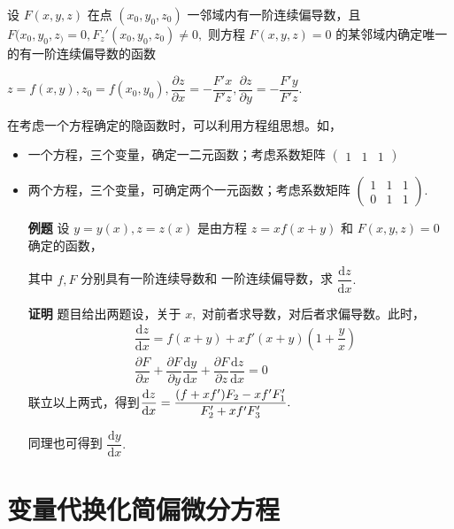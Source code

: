 
设 $ F(x,y,z) $ 在点 $ (x_0,y_0,z_0) $ 一邻域内有一阶连续偏导数，且 $ F(x_0,y_0,z_) = 0, F_z'(x_0,y_0,z_0) \neq 0, $ 
则方程 $ F(x,y,z) = 0 $ 的某邻域内确定唯一的有一阶连续偏导数的函数 

$ z = f(x,y), z_0 = f(x_0,y_0),
\dfrac{\partial z}{\partial x} = - \dfrac{F'x}{F'z},\dfrac{\partial z}{\partial y} = - \dfrac{F'y}{F'z}.  $ 

在考虑一个方程确定的隐函数时，可以利用方程组思想。如，
\begin{itemize}
    \item 一个方程，三个变量，确定一二元函数；考虑系数矩阵 $ \begin{pmatrix}
        1&1&1
    \end{pmatrix} $ 
    \item 两个方程，三个变量，可确定两个一元函数；考虑系数矩阵 $ \begin{pmatrix}
        1&1&1\\0&1&1
    \end{pmatrix}. $ 
\end{itemize}

\begin{itemize}
    \item[\textbf{例题}] 设 $ y = y(x),z = z(x) $ 是由方程 $ z = xf(x + y) $ 和 
    $ F(x,y,z) = 0 $ 确定的函数，
    
    其中 $ f,F $ 分别具有一阶连续导数和
    一阶连续偏导数，求 $ \dfrac{\mathrm{d}z}{\mathrm{d}x}. $ 
    \item[\textbf{证明}]
    题目给出两题设，关于 $ x, $ 对前者求导数，对后者求偏导数。此时，
    \begin{equation*}
        \begin{aligned}
            &\dfrac{\mathrm{d}z}{\mathrm{d}x} = f(x+y)+xf'(x+y)(1+\dfrac{y}{x}) \\ 
            &\dfrac{\partial F}{\partial x}+\dfrac{\partial F}{\partial y}\dfrac{\mathrm{d}y}{\mathrm{d}x}
            + \dfrac{\partial F}{\partial z}\dfrac{\mathrm{d}z}{\mathrm{d}x} = 0
        \end{aligned}
    \end{equation*}
    联立以上两式，得到$ \displaystyle \dfrac{\mathrm{d}z}{\mathrm{d}x} = \dfrac{(f+xf')F_2 - xf'F_1'}{F_2'+xf'F_3'}. $ 

    同理也可得到 $ \dfrac{\mathrm{d}y}{\mathrm{d}x}. $ 
\end{itemize}

\section{变量代换化简偏微分方程}

